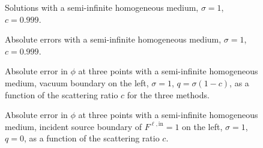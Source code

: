 \begin{figure}[htb]
  \centering
  \hspace{-.6in}
  \subfigure[$q=0.001$, $F^{\ell,\mathrm{in}}=0$]{
  
  }
  \hspace{-.2in}
  \subfigure[$q=0$, $F^{\ell,\mathrm{in}}=1$]{
  
  }
  \hspace{-.6in}
  \caption{Solutions with a semi-infinite homogeneous medium, $\sigma=1$,
  $c=0.999$.}
  \label{fig:bndycondSolutions}
\end{figure}

\begin{figure}[htb]
  \centering
  \hspace{-.6in}
  \subfigure[$q=0.001$, $F^{\ell,\mathrm{in}}=0$]{
  
  }
  \hspace{-.2in}
  \subfigure[$q=0$, $F^{\ell,\mathrm{in}}=1$]{
  
  }
  \hspace{-.6in}
  \caption{Absolute errors with a semi-infinite homogeneous medium, $\sigma=1$,
  $c=0.999$.}
  \label{fig:bndycondErrors}
\end{figure}

\begin{figure}[htb]
  \centering
  
  \caption{Absolute error in $\phi$ at three points with a semi-infinite
  homogeneous medium, vacuum boundary on the left, $\sigma=1$,
  $q=\sigma(1-c)$, as a function of the scattering ratio $c$ for the three
  methods.}
  \label{fig:bndycondHomogC}
\end{figure}

\begin{figure}[htb]
  \centering
  
  \caption{Absolute error in $\phi$ at three points with a semi-infinite
  homogeneous medium, incident source
  boundary of $F^{\ell,\mathrm{in}}=1$ on the left, $\sigma=1$, $q=0$, as a
  function of the scattering ratio $c$.}
  \label{fig:bndycondHomogC}
\end{figure}
%
%  

